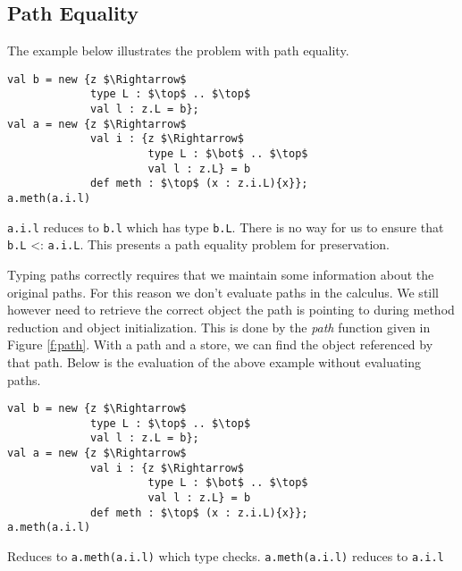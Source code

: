 \documentclass{llncs}
\numberwithin{subcase}{casethm}
\numberwithin{casethm}{theorem}
\numberwithin{casethm}{lemma}
\begin{document}
\subsection{Path Equality}
\label{s:patheq}
The example below illustrates the problem with path equality.
\begin{lstlisting}[mathescape, style=custom_lang]
val b = new {z $\Rightarrow$
             type L : $\top$ .. $\top$
             val l : z.L = b};
val a = new {z $\Rightarrow$
             val i : {z $\Rightarrow$
                      type L : $\bot$ .. $\top$
                      val l : z.L} = b
             def meth : $\top$ (x : z.i.L){x}};
a.meth(a.i.l)
\end{lstlisting}
\texttt{a.i.l} reduces to \texttt{b.l} which has type \texttt{b.L}. 
There is no way for us to ensure that \texttt{b.L} <: \texttt{a.i.L}.
This presents a path equality problem for preservation.

Typing paths correctly requires that we maintain some information 
about the original paths. For this reason we don't evaluate paths 
in the calculus. We still however need to retrieve the correct object 
the path is pointing to during method reduction and object initialization. 
This is done by the \emph{path} function given in Figure \ref{f:path}. 
With a path and a store, we can find the object referenced by that path.
Below is the evaluation of the above example without evaluating paths.
\begin{lstlisting}[mathescape, style=custom_lang]
val b = new {z $\Rightarrow$
             type L : $\top$ .. $\top$
             val l : z.L = b};
val a = new {z $\Rightarrow$
             val i : {z $\Rightarrow$
                      type L : $\bot$ .. $\top$
                      val l : z.L} = b
             def meth : $\top$ (x : z.i.L){x}};
a.meth(a.i.l)
\end{lstlisting}
Reduces to \texttt{a.meth(a.i.l)} which type checks. \texttt{a.meth(a.i.l)}
reduces to \texttt{a.i.l}
\end{document}
